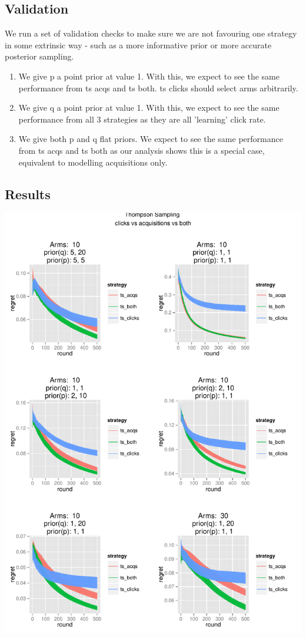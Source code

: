 \documentclass[11pt,a4,singlespacing,titlepagenumber=on]{scrreprt}
\numberwithin{equation}{chapter} %
\theoremstyle{remark}
\begin{document}
\subsection{Validation}

We run a set of validation checks to make sure we are not favouring one strategy in some extrinsic way - such as a more informative prior or more accurate posterior sampling.

\begin{enumerate}
	\item  We give p a point prior at value 1. With this, we expect to see the same performance from ts acqs and ts both. ts clicks should select arms arbitrarily.
	\item  We give q a point prior at value 1. With this, we expect to see the same performance from all 3 strategies as they are all 'learning' click rate.
	\item  We give both p and q flat priors. We expect to see the same performance from ts acqs and ts both as our analysis shows this is a special case, equivalent to modelling acquisitions only.
\end{enumerate}

\subsection{Results}

\includegraphics[scale=0.7]{P1to6.pdf}
\end{document}

